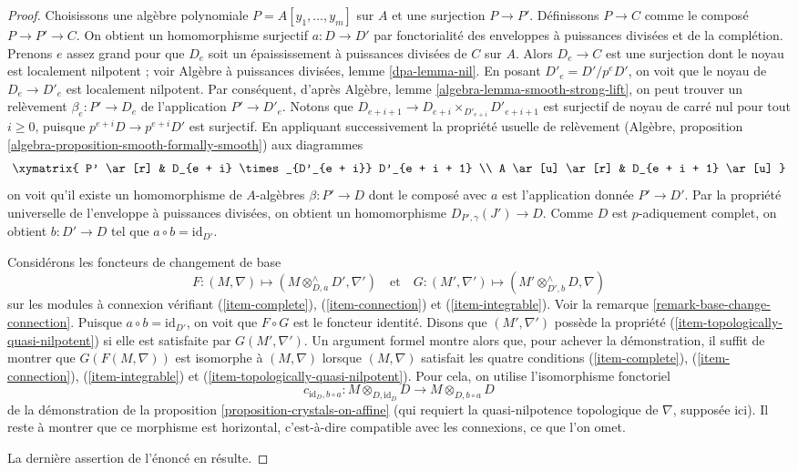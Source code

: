 \begin{proof}
Choisissons une algèbre polynomiale $P = A[y_1, \ldots, y_m]$ sur $A$ et une
surjection $P \to P'$. Définissons $P \to C$ comme le composé $P \to P' \to C$.
On obtient un homomorphisme surjectif $a : D \to D'$ par fonctorialité des
enveloppes à puissances divisées et de la complétion. Prenons $e$ assez grand pour que
$D_e$ soit un épaississement à puissances
divisées de $C$ sur $A$. Alors $D_e \to C$ est une surjection dont le noyau
est localement nilpotent ; voir Algèbre à puissances divisées, lemme \ref{dpa-lemma-nil}.
En posant $D'_e = D'/p^eD'$,
on voit que le noyau de $D_e \to D'_e$ est localement nilpotent.
Par conséquent, d'après Algèbre, lemme \ref{algebra-lemma-smooth-strong-lift},
on peut trouver un relèvement $\beta_e : P' \to D_e$ de l'application $P' \to D'_e$.
Notons que $D_{e + i + 1} \to D_{e + i} \times_{D'_{e + i}} D'_{e + i + 1}$
est surjectif de noyau de carré nul pour tout $i \geq 0$, puisque
$p^{e + i}D \to p^{e + i}D'$ est surjectif. En appliquant successivement la propriété
usuelle de relèvement (Algèbre, proposition \ref{algebra-proposition-smooth-formally-smooth})
aux diagrammes
$$
\xymatrix{
P' \ar[r] & D_{e + i} \times_{D'_{e + i}} D'_{e + i + 1} \\
A \ar[u] \ar[r] & D_{e + i + 1} \ar[u]
}
$$
on voit qu'il existe un homomorphisme de $A$-algèbres $\beta : P' \to D$ dont
le composé avec $a$ est l'application donnée $P' \to D'$.
Par la propriété universelle de l'enveloppe à puissances divisées, on obtient un
homomorphisme $D_{P', \gamma}(J') \to D$. Comme $D$ est $p$-adiquement complet, on
obtient $b : D' \to D$ tel que $a \circ b = \text{id}_{D'}$.

\medskip\noindent
Considérons les foncteurs de changement de base
$$
F : (M, \nabla) \longmapsto
(M \otimes^\wedge_{D, a} D', \nabla')
\quad\text{et}\quad
G : (M', \nabla') \longmapsto
(M' \otimes^\wedge_{D', b} D, \nabla)
$$
sur les modules à connexion vérifiant (\ref{item-complete}),
(\ref{item-connection}) et (\ref{item-integrable}).
Voir la remarque \ref{remark-base-change-connection}.
Puisque $a \circ b = \text{id}_{D'}$, on voit que
$F \circ G$ est le foncteur identité. Disons que $(M', \nabla')$
possède la propriété (\ref{item-topologically-quasi-nilpotent}) si elle
est satisfaite par $G(M', \nabla')$. Un argument formel montre alors que, pour achever
la démonstration, il suffit de montrer que $G(F(M, \nabla))$ est isomorphe
à $(M, \nabla)$ lorsque $(M, \nabla)$ satisfait les quatre
conditions (\ref{item-complete}), (\ref{item-connection}),
(\ref{item-integrable}) et (\ref{item-topologically-quasi-nilpotent}).
Pour cela, on utilise l'isomorphisme fonctoriel
$$
c_{\text{id}_D, b \circ a} :
M \otimes_{D, \text{id}_D} D
\longrightarrow
M \otimes_{D, b \circ a} D
$$
de la démonstration de la proposition \ref{proposition-crystals-on-affine}
(qui requiert la quasi-nilpotence topologique de $\nabla$,
supposée ici).
Il reste à montrer que ce morphisme est horizontal, c'est-à-dire
compatible avec les connexions, ce que l'on omet.

\medskip\noindent
La dernière assertion de l'énoncé en résulte.
\end{proof}

